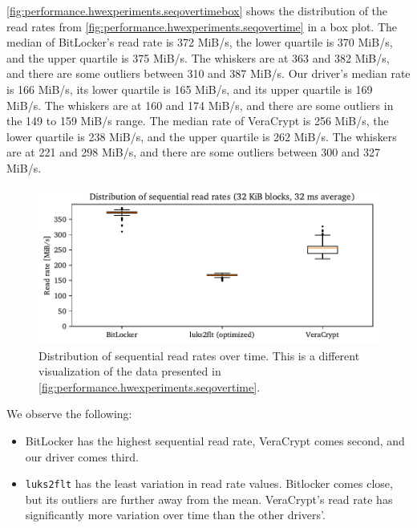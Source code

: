 \autoref{fig:performance.hwexperiments.seqovertimebox} shows the distribution of the read rates from \autoref{fig:performance.hwexperiments.seqovertime} in a box plot. The median of BitLocker's read rate is 372 MiB/s, the lower quartile is 370 MiB/s, and the upper quartile is 375 MiB/s. The whiskers are at 363 and 382 MiB/s, and there are some outliers between 310 and 387 MiB/s. Our driver's median rate is 166 MiB/s, its lower quartile is 165 MiB/s, and its upper quartile is 169 MiB/s. The whiskers are at 160 and 174 MiB/s, and there are some outliers in the 149 to 159 MiB/s range. The median rate of VeraCrypt is 256 MiB/s, the lower quartile is 238 MiB/s, and the upper quartile is 262 MiB/s. The whiskers are at 221 and 298 MiB/s, and there are some outliers between 300 and 327 MiB/s.

\begin{figure}[htb!]
	\center
	\includegraphics[scale=1]{../fig/performance.hwexperiments.seqovertimebox.pdf}
	\caption[
		Distribution of sequential read rates over time
	]{
		Distribution of sequential read rates over time. This is a different visualization of the data presented in \autoref{fig:performance.hwexperiments.seqovertime}.
	}
	\label{fig:performance.hwexperiments.seqovertimebox}
\end{figure}

We observe the following:
\begin{itemize}[beginpenalty=10000]
	\item BitLocker has the highest sequential read rate, VeraCrypt comes second, and our driver comes third.
	\item \texttt{luks2flt} has the least variation in read rate values. Bitlocker comes close, but its outliers are further away from the mean. VeraCrypt's read rate has significantly more variation over time than the other drivers'.
\end{itemize}

